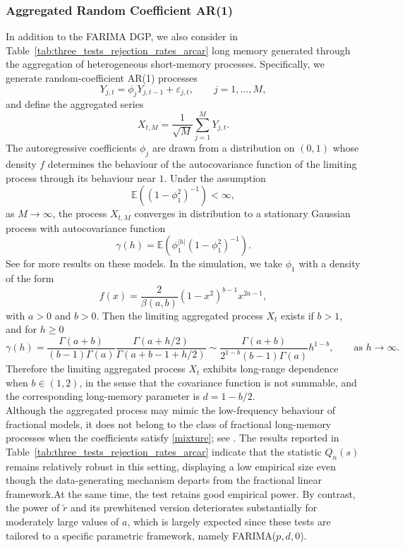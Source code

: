 \documentclass[12pt]{article}
\numberwithin{equation}{section}
\begin{document}
\subsubsection{Aggregated Random Coefficient AR(1)}
In addition to the  FARIMA DGP, we also consider in Table~\ref{tab:three_tests_rejection_rates_arcar} long memory generated through the aggregation of heterogeneous short-memory processes. Specifically, we generate random-coefficient AR(1) processes
\[
Y_{j,t}=\phi_j Y_{j,t-1}+\varepsilon_{j,t}, \qquad j=1,\ldots,M,
\]
and define the aggregated series
\[
X_{t,M}=\frac{1}{\sqrt{M}}\sum_{j=1}^M Y_{j,t}.
\]
The autoregressive coefficients $\phi_j$ are drawn from a distribution on $(0,1)$ whose density $f$ determines the behaviour of the autocovariance function of the limiting process through its behaviour near $1$. Under the assumption
\[
\mathbb{E}\!\left((1-\phi_1^2)^{-1}\right) < \infty,
\]
as $M\to\infty$, the process $X_{t,M}$ converges in distribution to a stationary Gaussian process with autocovariance function
\[
\gamma(h)=\mathbb{E}\!\left(\phi_1^{|h|}(1-\phi_1^2)^{-1}\right).
\]
See \cite{Leipus2014Aggregation,MR3075595,MR2977317} for more results on these models. 
In the simulation, we take $\phi_1$ with a density of the form
\begin{equation} \label{mixture}
     f(x) = \dfrac{2}{\beta (a,b)} (1-x^2)^{b-1 } x^{2a -1},
\end{equation}
with $a>0$ and $b>0$. Then the limiting aggregated process $X_t$ exists if $b>1$, and for $h\geq 0$
\[
\gamma(h) =
\frac{\Gamma (a+b)}{(b-1) \Gamma(a)}
\frac{\Gamma (a+h/2)}{ \Gamma(a+b-1 +h/2)}
\sim
\frac{\Gamma (a+b)}{ 2^{1-b}(b-1) \Gamma(a)} h^{1-b},\qquad\textrm{as }h\to\infty.
\]
Therefore the limiting aggregated process $X_t$ exhibits long-range dependence when $b\in(1,2)$, in the sense that the covariance function is not summable, and the corresponding long-memory parameter is $d = 1-b/2$.\\
Although the aggregated process may mimic the low-frequency behaviour of fractional models, it does not belong to the class of fractional long-memory processes when the coefficients satisfy \eqref{mixture}; see \cite{Celov01052010}. The results reported in Table~\ref{tab:three_tests_rejection_rates_arcar} indicate that the statistic $Q_n(s)$ remains relatively robust in this setting, displaying a low empirical size even though the data-generating mechanism departs from the fractional linear framework.At the same time, the test retains good empirical power. By contrast, the power of $\tilde r$ and its prewhitened version deteriorates substantially for moderately large values of $a$, which is largely expected since these tests are tailored to a specific parametric framework, namely FARIMA($p,d,0$).
\end{document}

